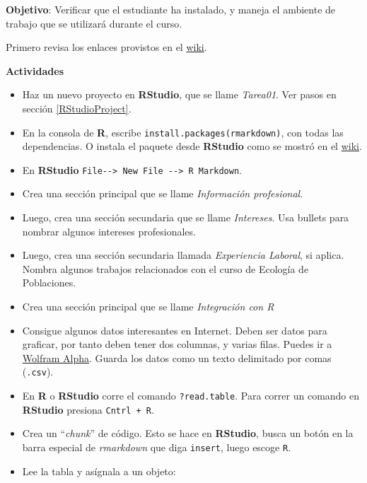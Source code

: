 \documentclass[12pt,letterpaper,]{book}
\begin{document}
\textbf{Objetivo}: Verificar que el estudiante ha instalado, y maneja el
ambiente de trabajo que se utilizará durante el curso.

Primero revisa los enlaces provistos en el
\href{https://github.com/dawidh15/dinPob/wiki/02-Instalaci\%C3\%B3n-del-software-necesario\#prueba-con-rmarkdown}{wiki}.

\textbf{Actividades}

\begin{itemize}
\item
  Haz un nuevo proyecto en \textbf{RStudio}, que se llame
  \emph{Tarea01}. Ver pasos en sección \ref{RStudioProject}.
\item
  En la consola de \textbf{R}, escribe
  \texttt{install.packages(rmarkdown)}, con todas las dependencias. O
  instala el paquete desde \textbf{RStudio} como se mostró en el
  \href{https://github.com/dawidh15/dinPob/wiki/02-Instalaci\%C3\%B3n-del-software-necesario}{wiki}.
\item
  En \textbf{RStudio}
  \texttt{File-\/-\textgreater{}\ New\ File\ -\/-\textgreater{}\ R\ Markdown}.
\item
  Crea una sección principal que se llame \emph{Información
  profesional}.
\item
  Luego, crea una sección secundaria que se llame \emph{Intereses}. Usa
  bullets para nombrar algunos intereses profesionales.
\item
  Luego, crea una sección secundaria llamada \emph{Experiencia Laboral},
  si aplica. Nombra algunos trabajos relacionados con el curso de
  Ecología de Poblaciones.
\item
  Crea una sección principal que se llame \emph{Integración con R}
\item
  Consigue algunos datos interesantes en Internet. Deben ser datos para
  graficar, por tanto deben tener dos columnas, y varias filas. Puedes
  ir a \href{https://www.wolframalpha.com/}{Wolfram Alpha}. Guarda los
  datos como un texto delimitado por comas (\texttt{.csv}).
\item
  En \textbf{R} o \textbf{RStudio} corre el comando
  \texttt{?read.table}. Para correr un comando en \textbf{RStudio}
  presiona \texttt{Cntrl\ +\ R}.
\item
  Crea un ``\emph{chunk}'' de código. Esto se hace en \textbf{RStudio},
  busca un botón en la barra especial de \emph{rmarkdown} que diga
  \texttt{insert}, luego escoge \texttt{R}.
\item
  Lee la tabla y asígnala a un objeto:
\end{itemize}
\end{document}
